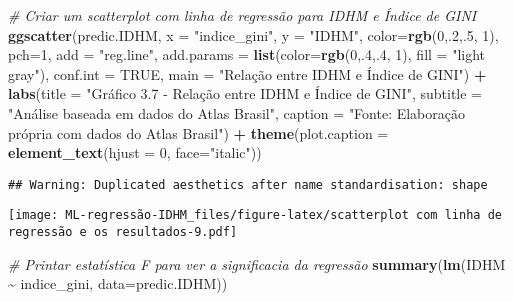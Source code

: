 \documentclass[
]{article}
\newenvironment{Shaded}{\begin{snugshade}}{\end{snugshade}}
\newcommand{\AttributeTok}[1]{\textcolor[rgb]{0.13,0.29,0.53}{#1}}
\newcommand{\CommentTok}[1]{\textcolor[rgb]{0.56,0.35,0.01}{\textit{#1}}}
\newcommand{\ConstantTok}[1]{\textcolor[rgb]{0.56,0.35,0.01}{#1}}
\newcommand{\DecValTok}[1]{\textcolor[rgb]{0.00,0.00,0.81}{#1}}
\newcommand{\FunctionTok}[1]{\textcolor[rgb]{0.13,0.29,0.53}{\textbf{#1}}}
\newcommand{\NormalTok}[1]{#1}
\newcommand{\SpecialCharTok}[1]{\textcolor[rgb]{0.81,0.36,0.00}{\textbf{#1}}}
\newcommand{\StringTok}[1]{\textcolor[rgb]{0.31,0.60,0.02}{#1}}
\begin{document}
\begin{Shaded}
\begin{Highlighting}[]
\CommentTok{\# Criar um scatterplot com linha de regressão para IDHM e Índice de GINI}
\FunctionTok{ggscatter}\NormalTok{(predic.IDHM, }\AttributeTok{x =} \StringTok{"indice\_gini"}\NormalTok{, }\AttributeTok{y =} \StringTok{"IDHM"}\NormalTok{, }
          \AttributeTok{color=}\FunctionTok{rgb}\NormalTok{(}\DecValTok{0}\NormalTok{,.}\DecValTok{2}\NormalTok{,.}\DecValTok{5}\NormalTok{,  }\DecValTok{1}\NormalTok{), }\AttributeTok{pch=}\DecValTok{1}\NormalTok{, }\AttributeTok{add =} \StringTok{"reg.line"}\NormalTok{, }
          \AttributeTok{add.params =} \FunctionTok{list}\NormalTok{(}\AttributeTok{color=}\FunctionTok{rgb}\NormalTok{(}\DecValTok{0}\NormalTok{,.}\DecValTok{4}\NormalTok{,.}\DecValTok{4}\NormalTok{,  }\DecValTok{1}\NormalTok{), }\AttributeTok{fill =} \StringTok{"light gray"}\NormalTok{), }
          \AttributeTok{conf.int =} \ConstantTok{TRUE}\NormalTok{, }\AttributeTok{main =} \StringTok{"Relação entre IDHM e Índice de GINI"}\NormalTok{) }\SpecialCharTok{+}
  \FunctionTok{labs}\NormalTok{(}\AttributeTok{title =} \StringTok{"Gráfico 3.7 {-} Relação entre IDHM e Índice de GINI"}\NormalTok{,}
       \AttributeTok{subtitle =} \StringTok{"Análise baseada em dados do Atlas Brasil"}\NormalTok{,}
       \AttributeTok{caption =} \StringTok{"Fonte: Elaboração própria com dados do Atlas Brasil"}\NormalTok{) }\SpecialCharTok{+}
  \FunctionTok{theme}\NormalTok{(}\AttributeTok{plot.caption =} \FunctionTok{element\_text}\NormalTok{(}\AttributeTok{hjust =} \DecValTok{0}\NormalTok{, }\AttributeTok{face=}\StringTok{"italic"}\NormalTok{))}
\end{Highlighting}
\end{Shaded}

\begin{verbatim}
## Warning: Duplicated aesthetics after name standardisation: shape
\end{verbatim}

\texttt{[image: ML-regressão-IDHM\_files/figure-latex/scatterplot com linha de regressão e os resultados-9.pdf]}

\begin{Shaded}
\begin{Highlighting}[]
\CommentTok{\# Printar estatística F para ver a significacia da regressão}
\FunctionTok{summary}\NormalTok{(}\FunctionTok{lm}\NormalTok{(IDHM }\SpecialCharTok{\textasciitilde{}}\NormalTok{ indice\_gini, }\AttributeTok{data=}\NormalTok{predic.IDHM))}
\end{Highlighting}
\end{Shaded}
\end{document}

